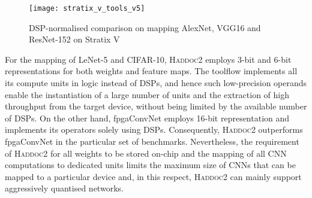\documentclass[format=acmsmall, review=false, screen=true]{acmart}
\begin{document}
\begin{figure*}[t]
    \centering
    \texttt{[image: stratix\_v\_tools\_v5]}
    \vspace{-0.4cm}
    \caption{DSP-normalised comparison on mapping AlexNet, VGG16 and ResNet-152 on Stratix V}
    \label{fig:stratix_v_tools}
    \vspace{-0.5cm}
\end{figure*}



{\color{black}For the mapping of LeNet-5 and CIFAR-10, \textsc{Haddoc2} employs 3-bit and 6-bit representations for both weights and feature maps. The toolflow implements all its compute units in logic instead of DSPs, and hence such low-precision operands enable the instantiation of a large number of units and the extraction of high throughput from the target device, without being limited by the available number of DSPs. On the other hand, fpgaConvNet employs 16-bit representation and implements its operators solely using DSPs. Consequently, \textsc{Haddoc2} outperforms fpgaConvNet in the particular set of benchmarks. Nevertheless, the requirement of \textsc{Haddoc2} for all weights to be stored on-chip and the mapping of all CNN computations to dedicated units limits the maximum size of CNNs that can be mapped to a particular device and, in this respect, \textsc{Haddoc2} can mainly support aggressively quantised networks.}
\end{document}

